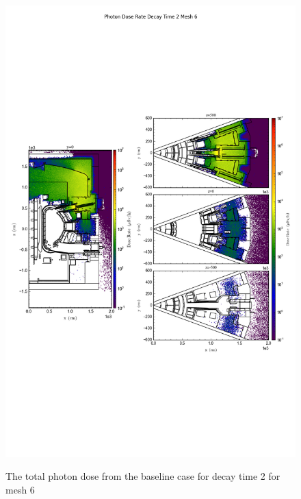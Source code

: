 \begin{figure}[ht!]
\centering
\includegraphics[trim={0cm 9cm 0cm 10cm},clip,scale=0.75]{../plots/final_model/Photon_Dose_Rate_Decay_Time_2_Mesh_6.png}
\label{fig:photons_dc2_no4bc_m6_flux}
\caption{The total photon dose from the baseline case for decay time 2 for mesh 6}
\end{figure}
